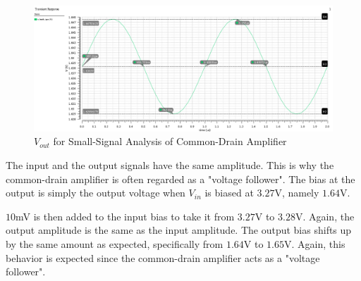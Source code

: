 \FloatBarrier

\begin{figure}[h!]
	\centering
	\includegraphics[scale=0.75]{../images/sim1_vout.PNG}
	\caption{$V_{out}$ for Small-Signal Analysis of Common-Drain Amplifier}
	\label{fig:sim1_vout}
\end{figure}

\FloatBarrier

The input and the output signals have the same amplitude.
This is why the common-drain amplifier is often regarded as a "voltage follower".
The bias at the output is simply the output voltage when $V_{in}$ is biased at $3.27$\si{\volt}, namely $1.64$\si{\volt}.

$10$\si{\milli\volt} is then added to the input bias to take it from $3.27$\si{\volt} to $3.28$\si{\volt}.
Again, the output amplitude is the same as the input amplitude.
The output bias shifts up by the same amount as expected, specifically from $1.64$\si{\volt} to $1.65$\si{\volt}.
Again, this behavior is expected since the common-drain amplifier acts as a "voltage follower".
